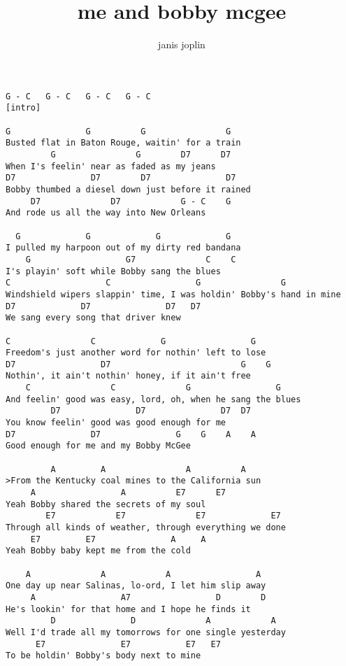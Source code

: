 \author{janis joplin}
\title{me and bobby mcgee}
\maketitle
\begin{verbatim}
G - C   G - C   G - C   G - C
[intro]

G               G          G                G
Busted flat in Baton Rouge, waitin' for a train
         G                G        D7      D7
When I's feelin' near as faded as my jeans
D7               D7        D7               D7
Bobby thumbed a diesel down just before it rained
     D7              D7            G - C    G
And rode us all the way into New Orleans

  G             G             G             G
I pulled my harpoon out of my dirty red bandana
    G                   G7              C    C
I's playin' soft while Bobby sang the blues
C                   C                 G                G
Windshield wipers slappin' time, I was holdin' Bobby's hand in mine
D7             D7               D7   D7
We sang every song that driver knew

C                C             G                 G
Freedom's just another word for nothin' left to lose
D7                 D7                          G    G
Nothin', it ain't nothin' honey, if it ain't free
    C                C              G                 G
And feelin' good was easy, lord, oh, when he sang the blues
         D7               D7               D7  D7
You know feelin' good was good enough for me
D7               D7               G    G    A    A
Good enough for me and my Bobby McGee

         A         A                A          A
>From the Kentucky coal mines to the California sun
     A                 A          E7      E7
Yeah Bobby shared the secrets of my soul
        E7            E7              E7             E7
Through all kinds of weather, through everything we done
     E7         E7               A     A
Yeah Bobby baby kept me from the cold

    A              A            A                 A
One day up near Salinas, lo-ord, I let him slip away
     A                 A7                 D        D
He's lookin' for that home and I hope he finds it
         D               D              A            A
Well I'd trade all my tomorrows for one single yesterday
      E7               E7           E7   E7
To be holdin' Bobby's body next to mine


\end{verbatim}
